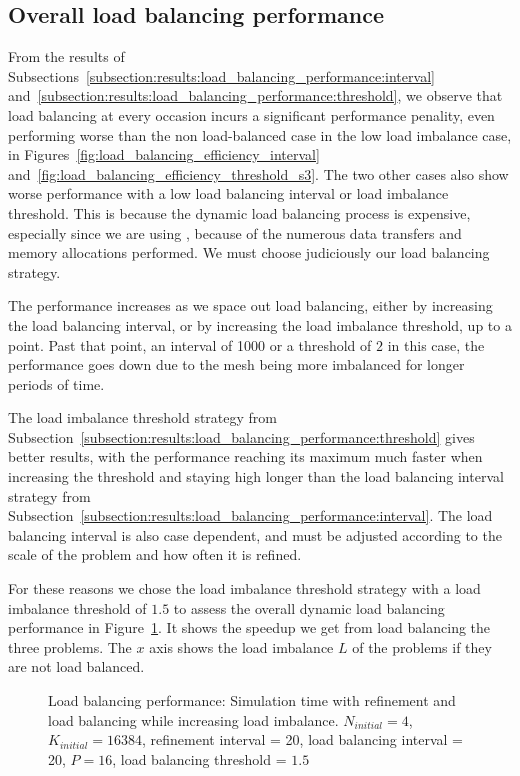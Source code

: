 \subsection{Overall load balancing performance}\label{subsection:results:load_balancing_performance:overall}

From the results of Subsections~\ref{subsection:results:load_balancing_performance:interval}
and~\ref{subsection:results:load_balancing_performance:threshold}, we observe that load balancing at
every occasion incurs a significant performance penality, even performing worse than the non
load-balanced case in the low load imbalance case, in
Figures~\ref{fig:load_balancing_efficiency_interval}
and~\ref{fig:load_balancing_efficiency_threshold_s3}. The two other cases also show worse
performance with a low load balancing interval or load imbalance threshold. This is because the
dynamic load balancing process is expensive, especially since we are using ,
because of the numerous data transfers and memory allocations performed. We must choose judiciously
our load balancing strategy. 

The performance increases as we space out load balancing, either by
increasing the load balancing interval, or by increasing the load imbalance threshold, up to a
point. Past that point, an interval of 1000 or a threshold of \(2\) in this case, the performance
goes down due to the mesh being more imbalanced for longer periods of time.

The load imbalance threshold strategy from
Subsection~\ref{subsection:results:load_balancing_performance:threshold} gives better results, with
the performance reaching its maximum much faster when increasing the threshold and staying high
longer than the load balancing interval strategy from
Subsection~\ref{subsection:results:load_balancing_performance:interval}. The load balancing interval
is also case dependent, and must be adjusted according to the scale of the problem and how often it
is refined. 

For these reasons we chose the load imbalance threshold strategy with a load imbalance threshold of
\(1.5\) to assess the overall dynamic load balancing performance in
Figure~\ref{fig:load_balancing_efficiency}. It shows the speedup we get from load balancing the
three problems. The \(x\) axis shows the load imbalance \(L\) of the problems if they are not load
balanced.

\begin{figure}[H]
	\centering
	
	\caption{Load balancing performance: Simulation time with refinement and load balancing while increasing load imbalance. \(N_{initial} = 4\), \(K_{initial} = 16384\), refinement interval = 20, load balancing interval = 20, \(P = 16\), load balancing threshold = \(1.5\)}\label{fig:load_balancing_efficiency}
\end{figure}

